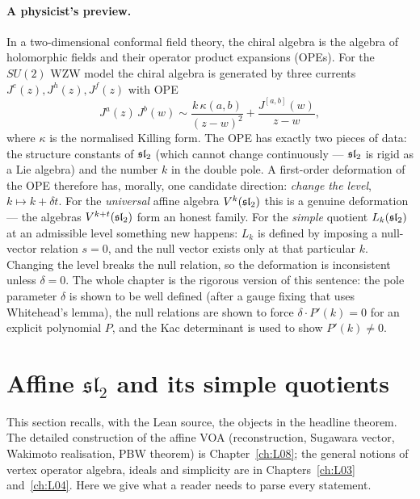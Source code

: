 \paragraph{A physicist's preview.}
In a two-dimensional conformal field theory, the chiral algebra is the algebra of holomorphic
fields and their operator product expansions (OPEs). For the $SU(2)$ WZW model the chiral algebra
is generated by three currents $J^e(z), J^h(z), J^f(z)$ with OPE
\begin{equation}\label{l09:eq:currentOPE}
  J^a(z)\,J^b(w) \sim \frac{k\,\kappa(a,b)}{(z-w)^2} + \frac{J^{[a,b]}(w)}{z-w},
\end{equation}
where $\kappa$ is the normalised Killing form. The OPE has exactly two pieces of data: the
structure constants of $\mathfrak{sl}_2$ (which cannot change continuously --- $\mathfrak{sl}_2$ is rigid as a Lie
algebra) and the number $k$ in the double pole. A first-order deformation of the OPE therefore
has, morally, one candidate direction: \emph{change the level}, $k \mapsto k + \delta t$. For the
\emph{universal} affine algebra $V^k(\mathfrak{sl}_2)$ this is a genuine deformation --- the algebras
$V^{k+t}(\mathfrak{sl}_2)$ form an honest family. For the \emph{simple} quotient $L_k(\mathfrak{sl}_2)$ at an
admissible level something new happens: $L_k$ is defined by imposing a null-vector relation
$s = 0$, and the null vector exists only at that particular $k$. Changing the level breaks the
null relation, so the deformation is inconsistent unless $\delta = 0$. The whole chapter is the
rigorous version of this sentence: the pole parameter $\delta$ is shown to be well defined (after a
gauge fixing that uses Whitehead's lemma), the null relations are shown to force
$\delta \cdot P'(k) = 0$ for an explicit polynomial $P$, and the Kac determinant is used to show
$P'(k)\neq 0$.

\section{Affine \texorpdfstring{$\mathfrak{sl}_2$}{sl(2)} and its simple quotients}\label{l09:sec:affine}

This section recalls, with the Lean source, the objects in the headline theorem. The detailed
construction of the affine VOA (reconstruction, Sugawara vector, Wakimoto realisation, PBW
theorem) is Chapter~\ref{ch:L08}; the general notions of vertex operator algebra, ideals and
simplicity are in Chapters~\ref{ch:L03} and~\ref{ch:L04}. Here we give what a reader needs to parse every statement.

